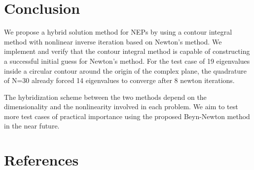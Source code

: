 \documentclass[11pt,letterpaper]{article}
\begin{document}
\section{Conclusion} 

We propose a hybrid solution method for NEPs by using a contour integral method with nonlinear inverse iteration based on Newton's method. We implement and verify that the contour integral method is capable of constructing a successful initial guess for Newton's method. For the test case of 19 eigenvalues inside a circular contour around the origin of the complex plane, the quadrature of N=30 already forced 14 eigenvalues to converge after 8 newton iterations.

The hybridization scheme between the two methods depend on the dimensionality and the nonlinearity involved in each problem. We aim to test more test cases of practical importance using the proposed Beyn-Newton method in the near future. 

\section{References}



\end{document}
